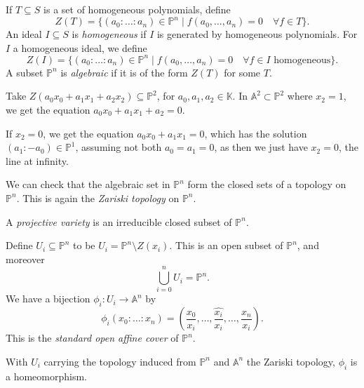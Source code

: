 \documentclass[12pt]{article}
\begin{document}
\begin{definition}
	If $T \subseteq S$ is a set of homogeneous polynomials, define
	\[
		Z(T) = \{(a_0: \ldots: a_n) \in \mathbb{P}^n \mid f(a_0, \ldots, a_n) = 0 \quad \forall f \in T\}.
	\]
	An ideal $I \subseteq S$ is \emph{homogeneous} if $I$ is generated by homogeneous polynomials. For $I$ a homogeneous ideal, we define
	\[
		Z(I) = \{(a_0: \ldots: a_n) \in \mathbb{P}^n \mid f(a_0, \ldots, a_n) = 0 \quad \forall f \in I \text{ homogeneous}\}.
	\]
	A subset $\mathbb{P}^n$ is \emph{algebraic} if it is of the form $Z(T)$ for some $T$.
\end{definition}

\begin{exbox}
	Take $Z(a_0 x_0 + a_1 x_1 + a_2 x_2) \subseteq \mathbb{P}^2$, for $a_0, a_1, a_2 \in \mathbb{K}$. In $\mathbb{A}^2 \subset \mathbb{P}^2$ where $x_2 = 1$, we get the equation $a_0 x_0 + a_1 x_1 + a_2 = 0$.

	If $x_2 = 0$, we get the equation $a_0 x_0 + a_1 x_1 = 0$, which has the solution $(a_1:-a_0) \in \mathbb{P}^1$, assuming not both $a_0 = a_1 = 0$, as then we just have $x_2 = 0$, the line at infinity.
\end{exbox}

We can check that the algebraic set in $\mathbb{P}^n$ form the closed sets of a topology on $\mathbb{P}^n$. This is again the \emph{Zariski topology} on $\mathbb{P}^n$.

\begin{definition}
	A \emph{projective variety} is an irreducible closed subset of $\mathbb{P}^n$.

	Define $U_i \subseteq \mathbb{P}^n$ to be $U_i = \mathbb{P}^n \setminus Z(x_i)$. This is an open subset of $\mathbb{P}^n$, and moreover
	\[
	\bigcup_{i = 0}^n U_i = \mathbb{P}^n.
	\]
	We have a bijection $\phi_i : U_i \to \mathbb{A}^n$ by
	\[
		\phi_i(x_0 : \ldots : x_n) = \left( \frac{x_0}{x_i}, \ldots, \widehat{\frac{x_i}{x_i}}, \ldots, \frac{x_n}{x_i} \right).
	\]
	This is the \emph{standard open affine cover} of $\mathbb{P}^n$.
\end{definition}

\begin{proposition}
	With $U_i$ carrying the topology induced from $\mathbb{P}^n$ and $\mathbb{A}^n$ the Zariski topology, $\phi_i$ is a homeomorphism.
\end{proposition}
\end{document}
